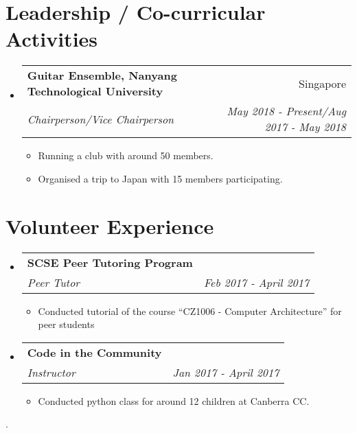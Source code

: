 \documentclass[letterpaper,11pt]{article}
\makeatletter
\newcommand{\resumeItem}[2]{
  \item\small{
    \textbf{#1}{: #2 \vspace{-2pt}}
  }
}
\newcommand{\resumeSubheading}[4]{
  \vspace{-1pt}\item
    \begin{tabular*}{0.97\textwidth}{l@{\extracolsep{\fill}}r}
      \textbf{#1} & #2 \\
      \textit{\small#3} & \textit{\small #4} \\
    \end{tabular*}\vspace{-5pt}
}
\newcommand{\resumeSubItem}[2]{\resumeItem{#1}{#2}\vspace{-4pt}}
\newcommand{\resumeSubHeadingListStart}{\begin{itemize}[leftmargin=*]}
\newcommand{\resumeSubHeadingListEnd}{\end{itemize}}
\newcommand{\resumeItemListStart}{\begin{itemize}}
\newcommand{\resumeItemListEnd}{\end{itemize}\vspace{-5pt}}
\makeatother
\begin{document}
\section{Leadership / Co-curricular Activities}
  \resumeSubHeadingListStart

    \resumeSubheading
      {Guitar Ensemble, Nanyang Technological University}{Singapore}
      {Chairperson/Vice Chairperson}{May 2018 - Present/Aug 2017 - May 2018}
      \resumeItemListStart
        \item{Running a club with around 50 members.}
        \item{Organised a trip to Japan with 15 members participating.}
      \resumeItemListEnd
  \resumeSubHeadingListEnd

\section{Volunteer Experience}
  \resumeSubHeadingListStart
    \resumeSubheading
      {SCSE Peer Tutoring Program}{}
      {Peer Tutor}{Feb 2017 - April 2017}
      \resumeItemListStart
        \item{Conducted tutorial of the course “CZ1006 - Computer Architecture” for peer students}
      \resumeItemListEnd
    \resumeSubheading
      {Code in the Community}{}
      {Instructor}{Jan 2017 - April 2017}
      \resumeItemListStart
        \item{Conducted python class for around 12 children at Canberra CC.}
      \resumeItemListEnd
  \resumeSubHeadingListEnd

.


%


\end{document}
